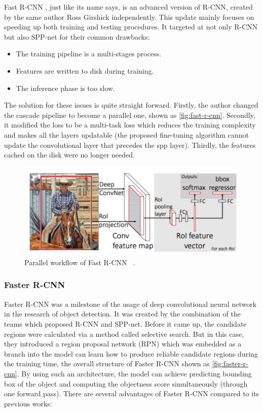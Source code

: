 Fast R-CNN \cite{fast-r-cnn-paper-2015}, just like its name says, is
an advanced version of R-CNN, created by the same author Ross Girshick 
independently. This update mainly focuses on speeding up both
training and testing procedures. It targeted
at not only R-CNN but also SPP-net for their common drawbacks:

\begin{itemize}
    \item The training pipeline is a multi-stages process.
    \item Features are written to disk during training.
    \item The inference phase is too slow.
\end{itemize}

The solution for these issues is quite straight forward. Firstly, the author
changed the cascade pipeline to become a parallel one, shown as
\autoref{fig:fast-r-cnn}. 
Secondly, it modified the loss to be a multi-task loss which reduces the
training complexity and makes all the layers updatable (the proposed fine-tuning
algorithm cannot update the convolutional layer that precedes the spp layer).
Thirdly, the features cached on the disk were no longer needed.

\begin{figure}
    \begin{center}
    \includegraphics[scale=0.7]{figures/fast_r_cnn.png}
    \end{center}
    \caption{Parallel workflow of Fast R-CNN
    ~\protect\cite{fast-r-cnn-paper-2015}.}
    \label{fig:fast-r-cnn}
\end{figure}


\subsubsection{Faster R-CNN}

Faster R-CNN \cite{faster-r-cnn-paper-2015} was a milestone of the usage of 
deep convolutional neural network in the research of object detection. It was 
created by the combination of the teams which proposed R-CNN and SPP-net.
Before it came up, the candidate regions were calculated via a method called 
selective search. 
But in this case, they introduced a region proposal network (RPN) which was 
embedded as a branch into the model can learn how to
produce reliable candidate regions during the training time, the overall
structure of Faster R-CNN shown as \autoref{fig:faster-r-cnn}.
By using such an architecture, the model can achieve predicting bounding box of 
the object and computing the objectness score simultaneously (through one 
forward pass). There are several advantages of Faster R-CNN compared to its 
previous works:

